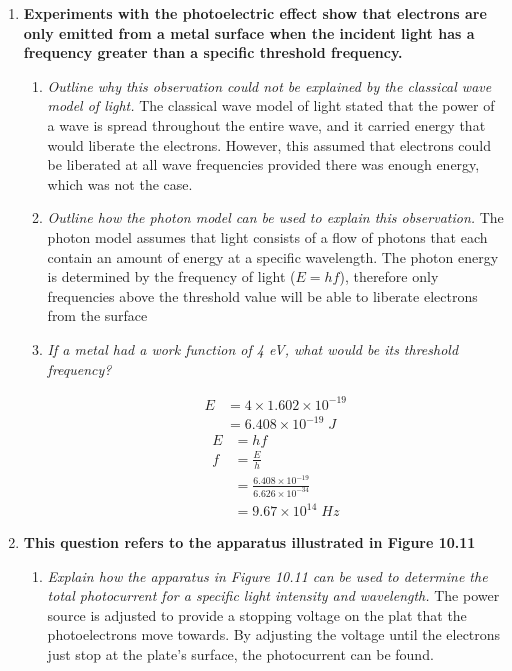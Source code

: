 \documentclass{report}
\begin{document}
\begin{enumerate}
			\item \textbf{Experiments with the photoelectric effect show that electrons are only emitted from a metal surface when the incident light has a frequency greater than a specific threshold frequency.}
				
				\begin{enumerate}
					\item \textit{Outline why this observation could not be explained by the classical wave model of light.}
						\subitem The classical wave model of light stated that the power of a wave is spread throughout the entire wave, and it carried energy that would liberate the electrons. However, this assumed that electrons could be liberated at all wave frequencies provided there was enough energy, which was not the case.
					
					\item \textit{Outline how the photon model can be used to explain this observation.}
						\subitem The photon model assumes that light consists of a flow of photons that each contain an amount of energy at a specific wavelength. The photon energy is determined by the frequency of light ($E = hf$), therefore only frequencies above the threshold value will be able to liberate electrons from the surface

					\item \textit{If a metal had a work function of 4 eV, what would be its threshold frequency?}

						\begin{align*}
							E &= 4 \times 1.602 \times 10^{-19} \\
							  &= 6.408 \times 10^{-19} \; J
						\end{align*}
						\begin{align*}
							E &= hf \\
							f &= \frac{E}{h} \\
							  &= \frac{6.408 \times 10^{-19}}{6.626 \times 10^{-34}} \\
							  &= 9.67 \times 10^{14} \; Hz
						\end{align*}

				\end{enumerate}

			\item \textbf{This question refers to the apparatus illustrated in Figure 10.11}

				\begin{enumerate}
					\item \textit{Explain how the apparatus in Figure 10.11 can be used to determine the total photocurrent for a specific light intensity and wavelength.}
						\subitem The power source is adjusted to provide a stopping voltage on the plat that the photoelectrons move towards. By adjusting the voltage until the electrons just stop at the plate's surface, the photocurrent can be found.


\end{enumerate}
\end{enumerate}
\end{document}
